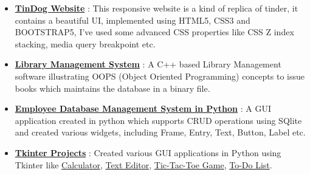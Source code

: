 \documentclass[margin, centered]{res}
\begin{document}
\begin{resume}
\begin{itemize}[leftmargin=*]
 \item \textbf{\href{https://tannuchoudhary.github.io/TinDog/}{TinDog Website}} : This responsive website is a kind of replica of tinder, it contains a beautiful UI, implemented using HTML5, CSS3 and BOOTSTRAP5, I've used some advanced CSS properties like CSS Z index stacking, media query breakpoint etc.
 \item \textbf{\href{https://github.com/tannuchoudhary/Library-Management-System}{Library Management System}} : A C++ based Library Management software illustrating OOPS (Object Oriented Programming) concepts to issue books which maintains the database in a binary file.
 \item \textbf{\href{https://github.com/tannuchoudhary/TkinterProjects/tree/main/EmployeeDBMS}{Employee Database Management System in Python}} : A GUI application created in python which supports CRUD operations using SQlite and created various widgets, including Frame, Entry, Text, Button, Label etc.
 
 \item \textbf{\href{https://github.com/tannuchoudhary/TkinterProjects}{Tkinter Projects}} : Created various GUI applications in Python using Tkinter like {\href{https://github.com/tannuchoudhary/TkinterProjects/tree/main/Calculator}{Calculator}}, {\href{https://github.com/tannuchoudhary/TkinterProjects/tree/main/Text Editor}{Text Editor}}, {\href{https://github.com/tannuchoudhary/TkinterProjects/tree/main/Tic-Tac-Toe Game}{Tic-Tac-Toe Game}}, {\href{https://github.com/tannuchoudhary/TkinterProjects/tree/main/To-Do list}{To-Do List}}.
 
\end{itemize}





\end{resume}
\end{document}
